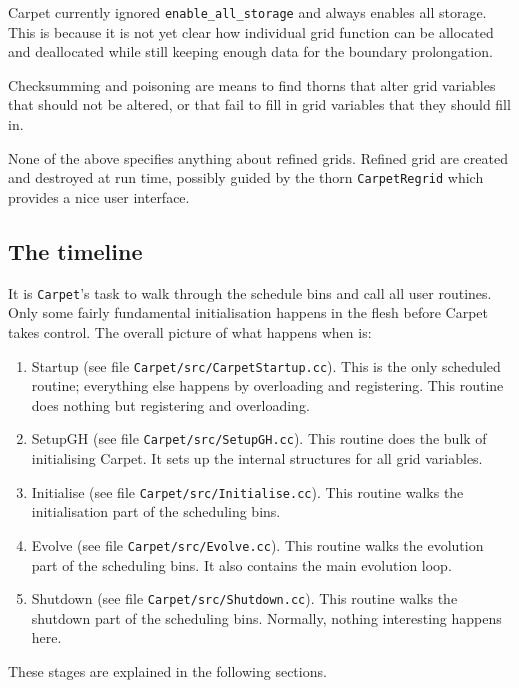 \documentclass{article}
\begin{document}
   Carpet currently ignored \texttt{enable\_all\_storage} and always
   enables all storage.  This is because it is not yet clear how
   individual grid function can be allocated and deallocated while
   still keeping enough data for the boundary prolongation.

   Checksumming and poisoning are means to find thorns that alter grid
   variables that should not be altered, or that fail to fill in grid
   variables that they should fill in.

   None of the above specifies anything about refined grids.  Refined
   grid are created and destroyed at run time, possibly guided by the
   thorn \texttt{CarpetRegrid} which provides a nice user interface.



\subsection{The timeline}

   It is \texttt{Carpet}'s task to walk through the schedule bins and
   call all user routines.  Only some fairly fundamental
   initialisation happens in the flesh before Carpet takes control.
   The overall picture of what happens when is:
\begin{enumerate}
\item
   Startup (see file \texttt{Carpet/src/CarpetStartup.cc}).  This is
   the only scheduled routine; everything else happens by overloading
   and registering.  This routine does nothing but registering and
   overloading.
\item
   SetupGH (see file \texttt{Carpet/src/SetupGH.cc}).  This routine
   does the bulk of initialising Carpet.  It sets up the internal
   structures for all grid variables.
\item
   Initialise (see file \texttt{Carpet/src/Initialise.cc}).  This
   routine walks the initialisation part of the scheduling bins.
\item
   Evolve (see file \texttt{Carpet/src/Evolve.cc}).  This routine
   walks the evolution part of the scheduling bins.  It also contains
   the main evolution loop.
\item
   Shutdown (see file \texttt{Carpet/src/Shutdown.cc}).  This routine
   walks the shutdown part of the scheduling bins.  Normally, nothing
   interesting happens here.
\end{enumerate}
   These stages are explained in the following sections.
\end{document}
